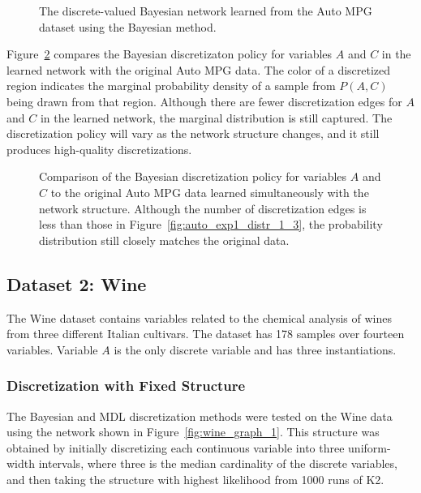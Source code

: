 \begin{figure}[ht]
  \centering
  \scalebox{0.9}{
  }
  \caption{The discrete-valued Bayesian network learned from the Auto MPG dataset using the Bayesian method.}
  \label{fig:auto_graph_2}
\end{figure}

Figure~\ref{fig:auto_exp2_distr_1_3} compares the Bayesian discretizaton policy for variables $A$ and $C$ in the learned network with the original Auto MPG data.
The color of a discretized region indicates the marginal probability density of a sample from $P(A,C)$ being drawn from that region.
Although there are fewer discretization edges for $A$ and $C$ in the learned network, the marginal distribution is still captured.
The discretization policy will vary as the network structure changes, and it still produces high-quality discretizations.

\begin{figure}[ht]
  \centering
  
  \caption{
    Comparison of the Bayesian discretization policy for variables $A$ and $C$ to the original Auto MPG data learned simultaneously with the network structure.
    Although the number of discretization edges is less than those in Figure~\ref{fig:auto_exp1_distr_1_3}, the probability distribution still closely matches the original data.
  }
  \label{fig:auto_exp2_distr_1_3}
\end{figure}

%
\subsection{Dataset 2: Wine}
\label{subsec:wine}

The Wine dataset contains variables related to the chemical analysis of wines from three different Italian cultivars.
The dataset has \num{178} samples over fourteen variables.
Variable $A$ is the only discrete variable and has three instantiations.

\subsubsection{Discretization with Fixed Structure}
\label{subsubsec:wine_exp1}

The Bayesian and MDL discretization methods were tested on the Wine data using the network shown in Figure~\ref{fig:wine_graph_1}.
This structure was obtained by initially discretizing each continuous variable into three uniform-width intervals, where three is the median cardinality of the discrete variables, and then taking the structure with highest likelihood from \num{1000} runs of K2.

